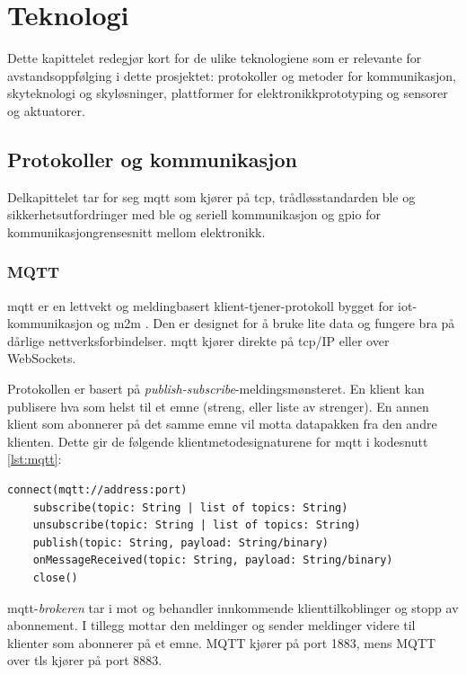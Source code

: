 \chapter{Teknologi}
\label{ch:technology}
Dette kapittelet redegjør kort for de ulike teknologiene som er relevante
for avstandsoppfølging i dette prosjektet: protokoller og metoder
for kommunikasjon, skyteknologi og skyløsninger, plattformer for elektronikkprototyping og sensorer og aktuatorer.

\section{Protokoller og kommunikasjon}
Delkapittelet tar for seg \gls{mqtt} som kjører
på \gls{tcp}, trådløsstandarden \gls{ble} og sikkerhetsutfordringer med \gls{ble} og seriell kommunikasjon og \gls{gpio} for kommunikasjongrensesnitt mellom elektronikk.

\subsection{MQTT}
\gls{mqtt} er en lettvekt og meldingbasert klient-tjener-protokoll bygget for \gls{iot}-kommunikasjon
og \gls{m2m} \citep{mqtt_standard}. Den er designet for å bruke lite data og fungere bra på
dårlige nettverksforbindelser. \gls{mqtt} kjører direkte på \gls{tcp}/IP eller over WebSockets.

Protokollen er basert på \textit{publish-subscribe}-meldingsmønsteret. En klient kan publisere hva som helst til
et emne (streng, eller liste av strenger). En annen klient som abonnerer på det samme emne
vil motta datapakken fra den andre klienten. Dette gir de følgende klientmetodesignaturene for \gls{mqtt}
i kodesnutt \ref{lst:mqtt}:

\begin{lstlisting}[frame=single, caption=Klientside-API for MQTT, label=lst:mqtt]
    connect(mqtt://address:port)
    subscribe(topic: String | list of topics: String)
    unsubscribe(topic: String | list of topics: String)
    publish(topic: String, payload: String/binary)
    onMessageReceived(topic: String, payload: String/binary)
    close()
\end{lstlisting}

\gls{mqtt}-\textit{brokeren} tar i mot og behandler innkommende klienttilkoblinger og stopp av abonnement. I tillegg
mottar den meldinger og sender meldinger videre til klienter som abonnerer på et emne. MQTT kjører på port 1883, mens
MQTT over \gls{tls} kjører på port 8883.

